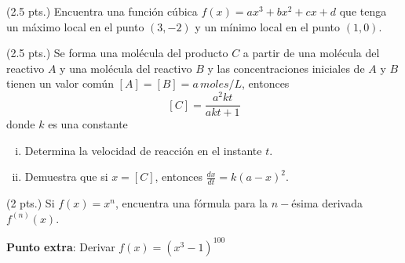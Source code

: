 \documentclass[12pt]{exam}
\begin{document}
\begin{questions}
    
\question (2.5 pts.)
    Encuentra una función cúbica $f(x)=ax^3+bx^2+cx+d$ que tenga un máximo local en el punto $(3,-2)$ y un mínimo local en el punto $(1,0)$. 


    \question  (2.5 pts.) Se forma una molécula del producto $C$ a partir de una molécula del reactivo $A$ y una molécula del reactivo $B$ y las concentraciones iniciales de $A$ y $B$ tienen un valor común $[A]=[B]=a\,moles/L$, entonces
    $$[C]=\frac{a^2kt}{akt+1}$$
    donde $k$ es una constante
    \begin{enumerate}[i)]
        \item Determina la velocidad de reacción en el instante $t$.
        \item Demuestra que si $x=[C]$, entonces $\frac{dx}{dt}=k(a-x)^2$.
    \end{enumerate}{}

\question (2 pts.) Si $f(x)=x^n$, encuentra una fórmula para la $n-$ésima derivada $f^{(n)}(x)$.


\vskip15pt
\textbf{Punto extra}: Derivar $f(x)=(x^3 -1)^{100}$

    
        \end{questions}
        \vskip30pt
 \RaggedRight
     
    \newpage



\pagestyle{foot}    %
\end{document}

